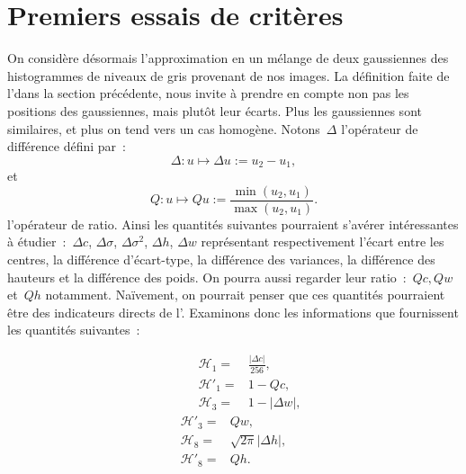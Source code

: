 \documentclass[main.tex]{subfiles}
\begin{document}
\section{Premiers essais de critères\label{sec:premier_essai_critere}}
On considère désormais l'approximation en un mélange de deux gaussiennes des histogrammes de niveaux de gris provenant de nos images. La définition faite de l'\hetero dans la section précédente, nous invite à prendre en compte non pas les positions des gaussiennes, mais plutôt leur écarts. Plus les gaussiennes sont similaires, et plus on tend vers un cas homogène. 
Notons~$\Delta$ l'opérateur de différence défini par~:
\begin{equation}
\label{eq:operateur_delta_gaussienne}
\Delta :  u \longmapsto \Delta u := u_2 - u_1,
\end{equation}
et
\begin{equation}
\label{eq:operateur_quotient_gaussienne}
Q : u \longmapsto Qu := \dfrac{ \min( u_2 , u_1) }{ \max( u_2 , u_1)  }.
\end{equation}
l'opérateur de ratio. 
Ainsi les quantités suivantes pourraient s'avérer intéressantes à étudier~:~$\Delta c$, $\Delta \sigma$,  $\Delta \sigma^2$, $\Delta h$, $\Delta w$ représentant respectivement l'écart entre les centres, la différence d'écart-type, la différence des variances, la différence des hauteurs et la différence des poids. On pourra aussi regarder leur ratio~:~$Qc, Qw$ et~$Qh$ notamment. Naïvement, on pourrait penser que ces quantités pourraient être des indicateurs directs de l'\hetero. 
Examinons donc les informations que fournissent les quantités suivantes~: %
\begin{multicols}{2}[\setlength{\columnseprule}{0.4pt}]%
\vspace*{-15mm} %
\leqnomode
\begin{align}
\quad &&\mathcal{H}_1 =& \frac{|\Delta c |}{256}, \label{eq:H1}\\
&&\mathcal{H}'_1 =& 1-Qc, \\ %
&& \mathcal{H}_3 =& 1- |\Delta w|,
\end{align}
\reqnomode
\begin{align}
\mathcal{H}'_3 =& Qw, \\
\mathcal{H}_8 =& \sqrt{2\pi}|\Delta h|, \\
\mathcal{H}'_8 =& Qh.  \label{eq:H8bis}  
\end{align}%
\end{multicols}
\end{document}
